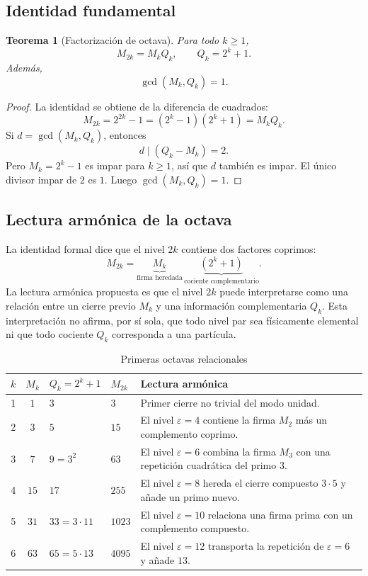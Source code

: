 \documentclass[11pt]{article}
\newtheorem{teorema}{Teorema}
\begin{document}
\subsection{Identidad fundamental}

\begin{teorema}[Factorización de octava]\label{th:octava}
Para todo $k\geq1$,
\[
\boxed{M_{2k}=M_kQ_k,\qquad Q_k=2^k+1.}
\]
Además,
\[
\gcd(M_k,Q_k)=1.
\]
\end{teorema}

\begin{proof}
La identidad se obtiene de la diferencia de cuadrados:
\[
M_{2k}=2^{2k}-1=(2^k-1)(2^k+1)=M_kQ_k.
\]
Si $d=\gcd(M_k,Q_k)$, entonces
\[
d\mid(Q_k-M_k)=2.
\]
Pero $M_k=2^k-1$ es impar para $k\geq1$, así que $d$ también es impar. El único divisor impar de $2$ es $1$. Luego $\gcd(M_k,Q_k)=1$.
\end{proof}

\subsection{Lectura armónica de la octava}

La identidad formal dice que el nivel $2k$ contiene dos factores coprimos:
\[
M_{2k}=\underbrace{M_k}_{\text{firma heredada}}\,
\underbrace{(2^k+1)}_{\text{cociente complementario}}.
\]
La lectura armónica propuesta es que el nivel $2k$ puede interpretarse como una relación entre un cierre previo $M_k$ y una información complementaria $Q_k$. Esta interpretación no afirma, por sí sola, que todo nivel par sea físicamente elemental ni que todo cociente $Q_k$ corresponda a una partícula.

\begin{table}[h]
\centering
\caption{Primeras octavas relacionales}
\label{tab:octavas}
\begin{tabular}{ccllp{5.0cm}}
\toprule
$k$ & $M_k$ & $Q_k=2^k+1$ & $M_{2k}$ & Lectura armónica\\
\midrule
1 & $1$ & $3$ & $3$ & Primer cierre no trivial del modo unidad.\\
2 & $3$ & $5$ & $15$ & El nivel $\varepsilon=4$ contiene la firma $M_2$ más un complemento coprimo.\\
3 & $7$ & $9=3^2$ & $63$ & El nivel $\varepsilon=6$ combina la firma $M_3$ con una repetición cuadrática del primo $3$.\\
4 & $15$ & $17$ & $255$ & El nivel $\varepsilon=8$ hereda el cierre compuesto $3\cdot5$ y añade un primo nuevo.\\
5 & $31$ & $33=3\cdot11$ & $1023$ & El nivel $\varepsilon=10$ relaciona una firma prima con un complemento compuesto.\\
6 & $63$ & $65=5\cdot13$ & $4095$ & El nivel $\varepsilon=12$ transporta la repetición de $\varepsilon=6$ y añade $13$.\\
\bottomrule
\end{tabular}
\end{table}
\end{document}
